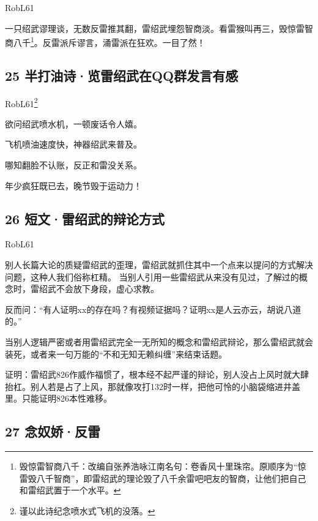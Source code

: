 RobL61

一只绍武谬理谈，无数反雷推其翻，雷绍武埋怨智商淡。看雷猴叫再三，毁惊雷智商八千\footnote{毁惊雷智商八千：改编自张养浩咏江南名句：卷香风十里珠帘。原顺序为``惊雷毁八千智商''，即雷绍武的理论毁了八千余雷吧吧友的智商，让他们把自己和雷绍武置于一个水平。}。反雷派斥谬言，涌雷派在狂欢。一目了然！

\hypertarget{ux534aux6253ux6cb9ux8bd7ux89c8ux96f7ux7ecdux6b66ux5728qqux7fa4ux53d1ux8a00ux6709ux611f}{%
\subsection{25
半打油诗·览雷绍武在QQ群发言有感}\label{ux534aux6253ux6cb9ux8bd7ux89c8ux96f7ux7ecdux6b66ux5728qqux7fa4ux53d1ux8a00ux6709ux611f}}

RobL61\footnote{谨以此诗纪念喷水式飞机的没落。}

欲问绍武喷水机，一顿废话令人嬉。

飞机喷油速度快，神器绍武来普及。

哪知翻脸不认账，反正和雷没关系。

年少疯狂既已去，晚节毁于运动力！ ~\\

\hypertarget{ux77edux6587ux96f7ux7ecdux6b66ux7684ux8fa9ux8bbaux65b9ux5f0f}{%
\subsection{26
短文·雷绍武的辩论方式}\label{ux77edux6587ux96f7ux7ecdux6b66ux7684ux8fa9ux8bbaux65b9ux5f0f}}

RobL61

别人长篇大论的质疑雷绍武的歪理，雷绍武就抓住其中一个点来以提问的方式解决问题，这种人我们俗称杠精。
当别人引用一些雷绍武从来没有见过，了解过的概念时，雷绍武不会放下身段，虚心求教。

反而问：``有人证明xx的存在吗？有视频证据吗？证明xx是人云亦云，胡说八道的。''

当别人逻辑严密或者用雷绍武完全一无所知的概念和雷绍武辩论，那么雷绍武就会装死，或者来一句万能的``不和无知无赖纠缠''来结束话题。

证明：雷绍武826作威作福惯了，根本经不起严谨的辩论，别人没占上风时就大肆抬杠。别人若是占了上风，那就像攻打132时一样，把他可怜的小脑袋缩进井盖里。只能证明826本性难移。

\hypertarget{ux5ff5ux5974ux5a07ux53cdux96f7}{%
\subsection{27 念奴娇·反雷}\label{ux5ff5ux5974ux5a07ux53cdux96f7}}

